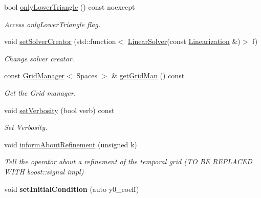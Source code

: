 \begin{DoxyCompactItemize}
\item 
bool \hyperlink{classSpacy_1_1KaskadeParabolic_1_1C1Operator_a427a378ab7a88427b8278182579f6674}{only\-Lower\-Triangle} () const noexcept
\begin{DoxyCompactList}\small\item\em Access only\-Lower\-Triangle flag. \end{DoxyCompactList}\item 
void \hyperlink{classSpacy_1_1KaskadeParabolic_1_1C1Operator_a22cb9eabdc7bee39bf77680c259d2d26}{set\-Solver\-Creator} (std\-::function$<$ \hyperlink{namespaceSpacy_adcd0d78166a9c972b8a2e5a689fc2d03}{Linear\-Solver}(const \hyperlink{classSpacy_1_1KaskadeParabolic_1_1PDE_1_1LinearBlockOperator}{Linearization} \&)$>$ f)
\begin{DoxyCompactList}\small\item\em Change solver creator. \end{DoxyCompactList}\item 
const \hyperlink{classSpacy_1_1KaskadeParabolic_1_1GridManager}{Grid\-Manager}$<$ Spaces $>$ \& \hyperlink{classSpacy_1_1KaskadeParabolic_1_1C1Operator_a9dd8aae0f2ff67da7020a17204a66483}{get\-Grid\-Man} () const 
\begin{DoxyCompactList}\small\item\em Get the Grid manager. \end{DoxyCompactList}\item 
void \hyperlink{classSpacy_1_1KaskadeParabolic_1_1C1Operator_abeabd783f5d7a66012f13aebf4a96039}{set\-Verbosity} (bool verb) const 
\begin{DoxyCompactList}\small\item\em Set Verbosity. \end{DoxyCompactList}\item 
void \hyperlink{classSpacy_1_1KaskadeParabolic_1_1C1Operator_aa46e91614226bbdef768798f4f61a140}{inform\-About\-Refinement} (unsigned k)
\begin{DoxyCompactList}\small\item\em Tell the operator about a refinement of the temporal grid (T\-O B\-E R\-E\-P\-L\-A\-C\-E\-D W\-I\-T\-H boost\-::signal impl) \end{DoxyCompactList}\item 
\hypertarget{classSpacy_1_1KaskadeParabolic_1_1C1Operator_a4977849b21f3e8d41de595ebd8b2d864}{void {\bfseries set\-Initial\-Condition} (auto y0\-\_\-coeff)}\label{classSpacy_1_1KaskadeParabolic_1_1C1Operator_a4977849b21f3e8d41de595ebd8b2d864}


\end{DoxyCompactItemize}
